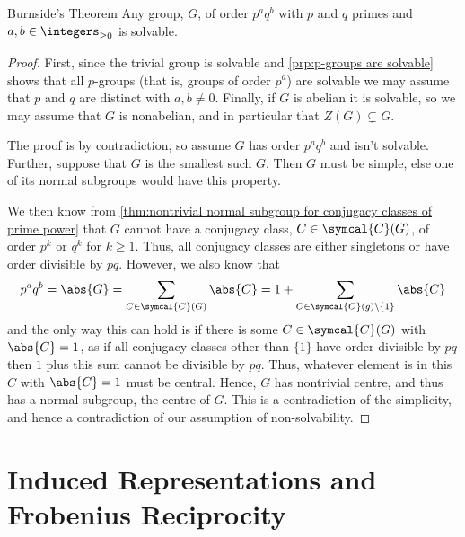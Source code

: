 \documentclass[fleqn]{NotesClass}
\newcommand{\conjugacyClasses}{\symcal{C}}
\begin{document}
    \begin{thm}{Burnside's Theorem}{}
        Any group, \(G\), of order \(p^aq^b\) with \(p\) and \(q\) primes and \(a, b \in \integers_{\ge 0}\) is solvable.
        \begin{proof}
            First, since the trivial group is solvable and \cref{prp:p-groups are solvable} shows that all \(p\)-groups (that is, groups of order \(p^a\)) are solvable we may assume that \(p\) and \(q\) are distinct with \(a, b \ne 0\).
            Finally, if \(G\) is abelian it is solvable, so we may assume that \(G\) is nonabelian, and in particular that \(Z(G) \subsetneq G\).
            
            The proof is by contradiction, so assume \(G\) has order \(p^aq^b\) and isn't solvable.
            Further, suppose that \(G\) is the smallest such \(G\).
            Then \(G\) must be simple, else one of its normal subgroups would have this property.
            
            We then know from \cref{thm:nontrivial normal subgroup for conjugacy classes of prime power} that \(G\) cannot have a conjugacy class, \(C \in \conjugacyClasses(G)\), of order \(p^k\) or \(q^k\) for \(k \ge 1\).
            Thus, all conjugacy classes are either singletons or have order divisible by \(pq\).
            However, we also know that
            \begin{equation}
                p^a q^b = \abs{G} = \sum_{C \in \conjugacyClasses(G)} \abs{C} = 1 + \sum_{C \in \conjugacyClasses(g) \setminus \{1\}} \abs{C}
            \end{equation}
            and the only way this can hold is if there is some \(C \in \conjugacyClasses(G)\) with \(\abs{C} = 1\), as if all conjugacy classes other than \(\{1\}\) have order divisible by \(pq\) then \(1\) plus this sum cannot be divisible by \(pq\).
            Thus, whatever element is in this \(C\) with \(\abs{C} = 1\) must be central.
            Hence, \(G\) has nontrivial centre, and thus has a normal subgroup, the centre of \(G\).
            This is a contradiction of the simplicity, and hence a contradiction of our assumption of non-solvability.
        \end{proof}
    \end{thm}
    
    \chapter{Induced Representations and Frobenius Reciprocity}
\end{document}
